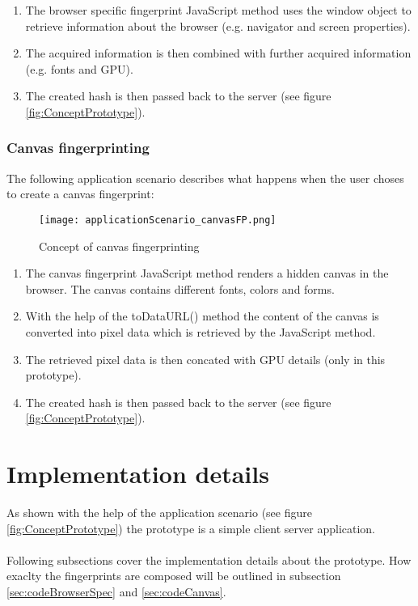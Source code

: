 \begin{enumerate}
	\item The browser specific fingerprint JavaScript method uses the window object to retrieve information about the browser (e.g. navigator and screen properties).
	\item The acquired information is then combined with further acquired information (e.g. fonts and GPU).
	\item The created hash is then passed back to the server (see figure \ref{fig:ConceptPrototype}).\\
\end{enumerate}




\subsubsection{Canvas fingerprinting}\label{sec:appCanvas}
The following application scenario describes what happens when the user choses to create a canvas fingerprint:

\begin{figure}[H]
	\centering
	\texttt{[image: applicationScenario\_canvasFP.png]}
	\caption{Concept of canvas fingerprinting\\}
	\label{ConceptCanvasFingerprinting}
\end{figure}

\begin{enumerate}
	\item The canvas fingerprint JavaScript method renders a hidden canvas in the browser. The canvas contains different fonts, colors and forms.
	\item  With the help of the toDataURL() method the content of the canvas is converted into pixel data which is retrieved by the JavaScript method.
	\item The retrieved pixel data is then concated with GPU details (only in this prototype).
	\item The created hash is then passed back to the server (see figure \ref{fig:ConceptPrototype}).\\
\end{enumerate}


\section{Implementation details}
As shown with the help of the application scenario (see figure \ref{fig:ConceptPrototype}) the prototype is a simple client server application. \\\\
Following subsections cover the implementation details about the prototype. How exaclty the fingerprints are composed will be outlined in subsection \autoref{sec:codeBrowserSpec} and \autoref{sec:codeCanvas}.

